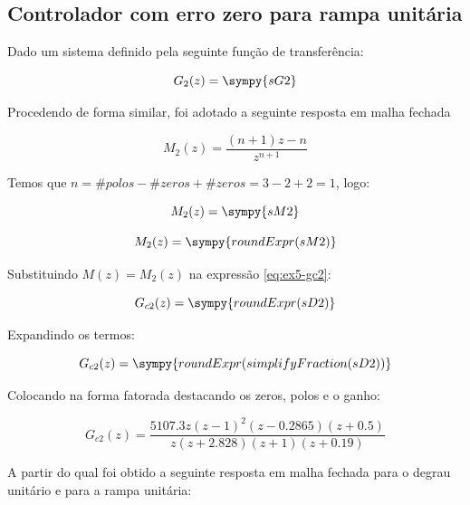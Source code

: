 \documentclass[a4paper,11pt]{article}
\begin{document}
\subsection{Controlador com erro zero para rampa unitária}

Dado um sistema definido pela seguinte função de transferência:

\begin{equation}\label{eq:ex5-g2}
    G_2(z) = \sympy{sG2}
\end{equation}

Procedendo de forma similar, foi adotado a seguinte resposta em malha fechada

$$
    M_2(z) = \frac{(n+1)z -n}{z^{n+1}}
$$

Temos que $n = \#polos - \#zeros + \#zeros = 3  - 2 + 2 = 1$, logo:

\begin{equation}\label{eq:ex5-g2}
    M_2(z) = \sympy{sM2}
\end{equation}

$$M_2(z) = \sympy{roundExpr(sM2)}$$

Substituindo $M(z) = M_2(z)$ na expressão \ref{eq:ex5-gc2}:

$$G_{c2}(z) = \sympy{roundExpr(sD2)}$$

Expandindo os termos:

$$G_{c2}(z) = \sympy{roundExpr(simplifyFraction(sD2))}$$

Colocando na forma fatorada destacando os zeros, polos e o ganho:

\begin{equation}
    G_{c2}(z) = \frac{5107.3 z (z-1)^2 (z-0.2865) (z+0.5)}{z (z+2.828) (z+1) (z+0.19)}
\end{equation}

A partir do qual foi obtido a seguinte resposta em malha fechada para o degrau unitário e para a rampa unitária:
\end{document}
